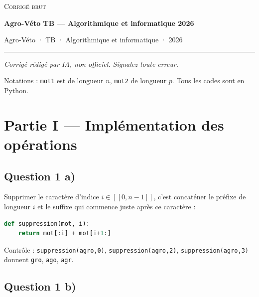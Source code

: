 \documentclass[11pt,a4paper]{article}
\begin{document}
\thispagestyle{plain}
\begin{center}
  {\small\scshape Corrigé brut}\par\smallskip
  {\LARGE\bfseries Agro-Véto TB — Algorithmique et informatique 2026\par}\medskip
  {\large Agro-Véto · TB · Algorithmique et informatique · 2026\par}
\end{center}
\vspace{2pt}\hrule\vspace{8pt}

\emph{Corrigé rédigé par IA, non officiel. Signalez toute erreur.}

Notations : \texttt{mot1} est de longueur \(n\), \texttt{mot2} de longueur \(p\). Tous les codes sont en Python.

\hypertarget{partie-i-impluxe9mentation-des-opuxe9rations}{%
\section{Partie I --- Implémentation des opérations}\label{partie-i-impluxe9mentation-des-opuxe9rations}}

\hypertarget{question-1-a}{%
\subsection{Question 1 a)}\label{question-1-a}}

Supprimer le caractère d'indice \(i\in[\![0,n-1]\!]\), c'est concaténer le préfixe de longueur \(i\) et le suffixe qui commence juste après ce caractère :

\begin{lstlisting}[language=Python]
def suppression(mot, i):
    return mot[:i] + mot[i+1:]
\end{lstlisting}

Contrôle : \texttt{suppression(\allowbreak{}\textquotesingle{}agro\textquotesingle{},\allowbreak{}0)\allowbreak{}}, \texttt{suppression(\allowbreak{}\textquotesingle{}agro\textquotesingle{},\allowbreak{}2)\allowbreak{}}, \texttt{suppression(\allowbreak{}\textquotesingle{}agro\textquotesingle{},\allowbreak{}3)\allowbreak{}} donnent \texttt{\textquotesingle{}gro\textquotesingle{}}, \texttt{\textquotesingle{}ago\textquotesingle{}}, \texttt{\textquotesingle{}agr\textquotesingle{}}.

\hypertarget{question-1-b}{%
\subsection{Question 1 b)}\label{question-1-b}}
\end{document}
